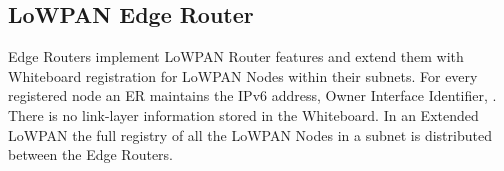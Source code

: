 \subsection{LoWPAN Edge Router}
Edge Routers implement LoWPAN Router features and extend them with Whiteboard registration for LoWPAN Nodes within their subnets. For every registered node an ER maintains the IPv6 address, Owner Interface Identifier, . There is no link-layer information stored in the Whiteboard. In an Extended LoWPAN the full registry of all the LoWPAN Nodes in a subnet is distributed between the Edge Routers.


